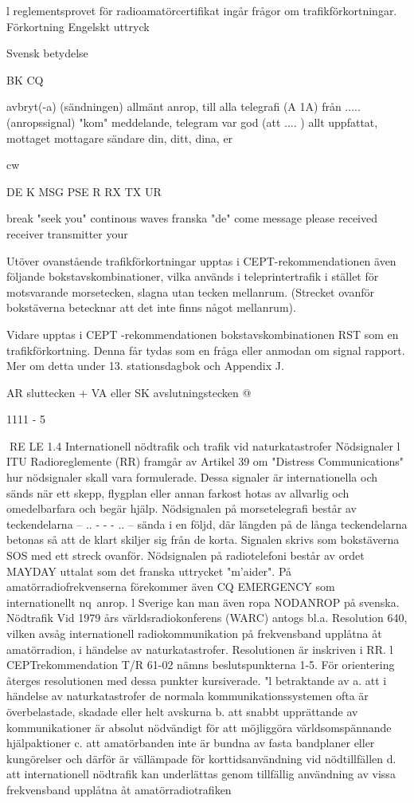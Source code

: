 \documentclass[a4paper,twoside,twocolumn,openright]{book}
\begin{document}
{{{{{l reglementsprovet för radioamatörcertifikat ingår frågor om trafikförkortningar.
Förkortning Engelskt uttryck

Svensk betydelse

BK
CQ

avbryt(-a) (sändningen)
allmänt anrop, till alla
telegrafi (A 1A)
från ..... (anropssignal)
"kom"
meddelande, telegram
var god (att .... )
allt uppfattat, mottaget
mottagare
sändare
din, ditt, dina, er

cw

DE
K
MSG
PSE
R
RX
TX
UR

break
"seek you"
continous waves
franska "de"
come
message
please
received
receiver
transmitter
your

Utöver ovanstående trafikförkortningar upptas i CEPT-rekommendationen även följande bokstavskombinationer, vilka används i
teleprintertrafik i stället för motsvarande
morsetecken, slagna utan tecken mellanrum.
(Strecket ovanför bokstäverna betecknar
att det inte finns något mellanrum).

Vidare upptas i CEPT -rekommendationen bokstavskombinationen RST som en
trafikförkortning. Denna får tydas som en
fråga eller anmodan om signal rapport.
Mer om detta under 13. stationsdagbok
och Appendix J.

AR
sluttecken
+
VA eller SK avslutningstecken @

1111 - 5

RE LE
1.4 Internationell nödtrafik och trafik vid naturkatastrofer
Nödsignaler
l ITU Radioreglemente (RR) framgår av Artikel 39 om "Distress Communications" hur
nödsignaler skall vara formulerade. Dessa
signaler är internationella och sänds när ett
skepp, flygplan eller annan farkost hotas av
allvarlig och omedelbarfara och begär hjälp.
Nödsignalen på morsetelegrafi består av
teckendelarna -- .. - - - .. -- sända i en följd,
där längden på de långa teckendelarna betonas så att de klart skiljer sig från de korta.
Signalen skrivs som bokstäverna SOS med
ett streck ovanför.
Nödsignalen på radiotelefoni består av
ordet MAYDAY uttalat som det franska uttrycket "m'aider".
På amatörradiofrekvenserna förekommer
även CQ EMERGENCY som internationellt
nq~anrop. l Sverige kan man även ropa
NODANROP på svenska.
Nödtrafik
Vid 1979 års världsradiokonferens (WARC)
antogs bl.a. Resolution 640, vilken avsåg
internationell radiokommunikation på frekvensband upplåtna åt amatörradion, i händelse av naturkatastrofer.
Resolutionen är inskriven i RR. l CEPTrekommendation T/R 61-02 nämns beslutspunkterna 1-5. För orientering återges resolutionen med dessa punkter kursiverade.
"l betraktande av
a. att i händelse av naturkatastrofer de normala kommunikationssystemen ofta är
överbelastade, skadade eller helt avskurna
b. att snabbt upprättande av kommunikationer är absolut nödvändigt för att möjliggöra världsomspännande hjälpaktioner
c. att amatörbanden inte är bundna av fasta
bandplaner eller kungörelser och därför
är vällämpade för korttidsanvändning vid
nödtillfällen
d. att internationell nödtrafik kan underlättas genom tillfällig användning av vissa
frekvensband upplåtna åt amatörradiotrafiken

}}}}}
\end{document}
